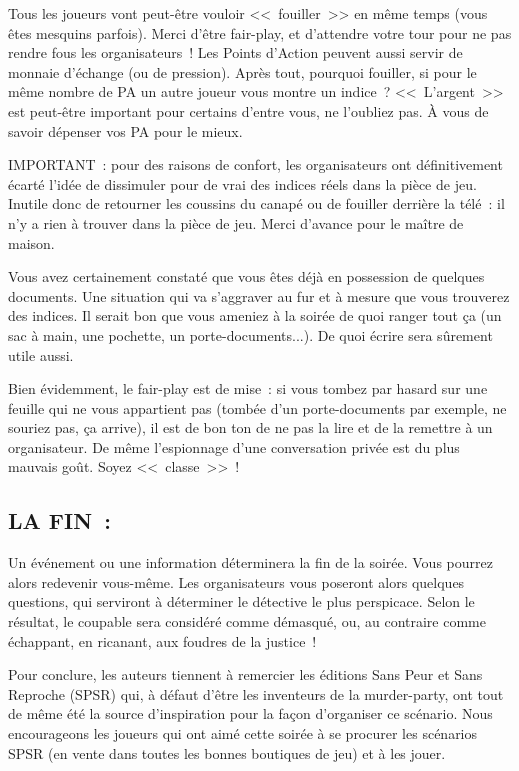 \documentclass[14pt,twocolumn]{extarticle}
\begin{document}
Tous les joueurs vont peut-être vouloir <<~fouiller~>> en même temps (vous êtes
mesquins parfois). Merci d’être fair-play, et d’attendre votre tour pour ne pas
rendre fous les organisateurs~! Les Points d’Action peuvent aussi servir de
monnaie d’échange (ou de pression). Après tout, pourquoi fouiller, si pour le
même nombre de PA un autre joueur vous montre un indice~? <<~L’argent~>> est
peut-être important pour certains d’entre vous, ne l’oubliez pas. À vous de
savoir dépenser vos PA pour le mieux.

IMPORTANT~: pour des raisons de confort, les organisateurs ont définitivement
écarté l’idée de dissimuler pour de vrai des indices réels dans la pièce de
jeu. Inutile donc de retourner les coussins du canapé ou de fouiller derrière
la télé~: il n’y a rien à trouver dans la pièce de jeu. Merci d’avance pour le
maître de maison.

Vous avez certainement constaté que vous êtes déjà en possession de quelques
documents. Une situation qui va s’aggraver au fur et à mesure que vous
trouverez des indices. Il serait bon que vous ameniez à la soirée de quoi
ranger tout ça (un sac à main, une pochette, un porte-documents...). De quoi
écrire sera sûrement utile aussi.

Bien évidemment, le fair-play est de mise~: si vous tombez par hasard sur une
feuille qui ne vous appartient pas (tombée d’un porte-documents par exemple, ne
souriez pas, ça arrive), il est de bon ton de ne pas la lire et de la remettre
à un organisateur. De même l’espionnage d’une conversation privée est du plus
mauvais goût. Soyez <<~classe~>>~!

\subsection{LA FIN~:}

Un événement ou une information déterminera la fin de la soirée. Vous pourrez
alors redevenir vous-même. Les organisateurs vous poseront alors quelques
questions, qui serviront à déterminer le détective le plus perspicace. Selon le
résultat, le coupable sera considéré comme démasqué, ou, au contraire comme
échappant, en ricanant, aux foudres de la justice~!

Pour conclure, les auteurs tiennent à remercier les éditions Sans Peur et Sans
Reproche (SPSR) qui, à défaut d’être les inventeurs de la murder-party, ont
tout de même été la source d’inspiration pour la façon d’organiser ce scénario.
Nous encourageons les joueurs qui ont aimé cette soirée à se procurer les
scénarios SPSR (en vente dans toutes les bonnes boutiques de jeu) et à les
jouer.  
\framebox[\columnwidth]{}
\end{document}
